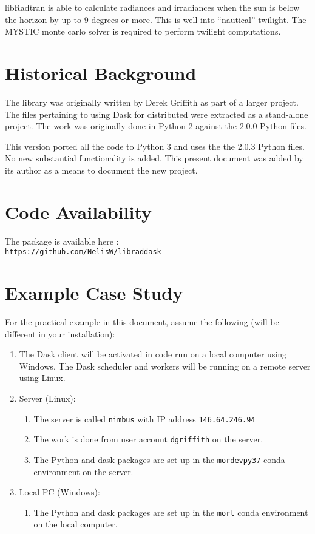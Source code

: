 libRadtran is able to calculate radiances and irradiances when the sun is below the horizon by up
to 9 degrees or more. This is well into ``nautical'' twilight. The MYSTIC monte carlo solver is
required to perform twilight computations.


\section{Historical Background}
The \libraddask{} library was originally written by Derek Griffith \cite{DerekJGriffithMORTICIA} as part of a larger project.  The files pertaining to using Dask for distributed \libradtran{} were extracted as a stand-alone project.  The work was originally done in Python 2 against the \libradtran{} 2.0.0 Python files.

This version ported all the code to Python 3 and uses the  the \libradtran{} 2.0.3 Python files.
No new substantial functionality is added.
This present document was added by its author as a means to document the new project.

\section{Code Availability}

The \libraddask{} package is available here \cite{Willerslibraddask2020}:\\
\lstinline{https://github.com/NelisW/libraddask}

\section{Example Case Study}

For the practical example in this document, assume the following (will be different in your installation):
\begin{enumerate}
\item The Dask client will be activated in code run on a local computer using Windows.  The Dask scheduler and workers will be running on a remote server using Linux.
\item Server (Linux):
\begin{enumerate}
\item The server is called \lstinline{nimbus} with \ac{IP} address \lstinline{146.64.246.94}
\item The work is done from  user account \lstinline{dgriffith} on the server.
\item The Python and dask packages are set up in the \lstinline{mordevpy37} conda environment  on the server.
\end{enumerate}

\item Local \ac{PC} (Windows):
\begin{enumerate}
\item The Python and dask packages are set up in the \lstinline{mort} conda environment  on the local computer.
\end{enumerate}

\end{enumerate}


